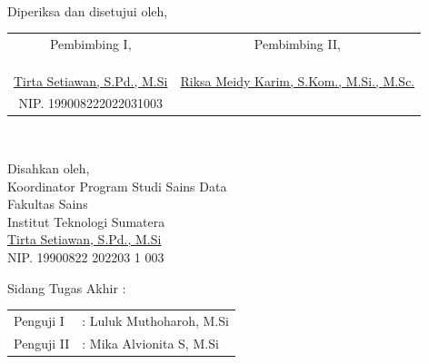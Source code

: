 \begin{center}
\begin{singlespace}
\begin{minipage}{0.2\textwidth}
		\end{minipage}
		\begin{onehalfspace}
			\\[0.5cm]
		\end{onehalfspace}
	\end{singlespace}	
		\vspace{-0.5cm} %
	\centering Diperiksa dan disetujui oleh,
	\vspace{1em} %
	\justify
	\setlength{\tabcolsep}{0pt}
	\begin{tabular}{p{}p{}}
		\multicolumn{1}{c}{Pembimbing I,} & \multicolumn{1}{c}{Pembimbing II,}\\
		&\\
		&\\
		&\\
		\multicolumn{1}{c}{\underline{Tirta Setiawan, S.Pd., M.Si}} & \multicolumn{1}{c}{\underline{Riksa Meidy Karim, S.Kom., M.Si., M.Sc.}} \\
		\multicolumn{1}{c}{NIP. 199008222022031003} & \multicolumn{1}{c}{} \\
	\end{tabular}
	\\
	\centering 
	\begin{singlespace}
		Disahkan oleh,\\
			\vspace{1em} %
		Koordinator Program Studi Sains Data\\
		Fakultas Sains\\
		Institut Teknologi Sumatera\\[1.5cm]
		\underline{Tirta Setiawan, S.Pd., M.Si} \\ %
		NIP. 19900822 202203 1 003
	\end{singlespace}
\end{center}

	\vspace{0.5cm} %
\begin{flushright}
	Sidang Tugas Akhir :     
\end{flushright}
	\vspace{-1.0cm} %

	\flushleft
\setlength{\tabcolsep}{0pt}
\begin{tabular}{l l}
	Penguji  I 			&  : Luluk Muthoharoh, M.Si \\
	Penguji  II 		&  : Mika Alvionita S, M.Si
\end{tabular}